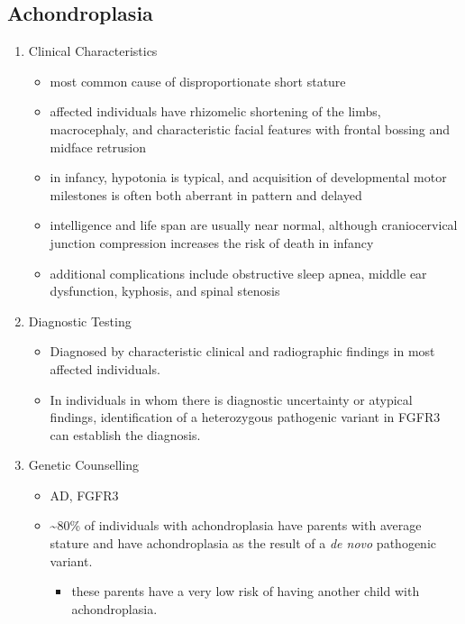 \documentclass[12pt]{scrartcl}
\begin{document}
\subsection{Achondroplasia}
\label{sec:orgec2fc75}
\begin{enumerate}
\item Clinical Characteristics
\label{sec:org15b2107}
\begin{itemize}
\item most common cause of disproportionate short stature
\item affected individuals have rhizomelic shortening of the limbs,
macrocephaly, and characteristic facial features with frontal
bossing and midface retrusion
\item in infancy, hypotonia is typical, and acquisition of developmental
motor milestones is often both aberrant in pattern and delayed
\item intelligence and life span are usually near normal, although
craniocervical junction compression increases the risk of death in
infancy
\item additional complications include obstructive sleep apnea, middle ear
dysfunction, kyphosis, and spinal stenosis
\end{itemize}

\item Diagnostic Testing
\label{sec:orga32fb81}
\begin{itemize}
\item Diagnosed by characteristic clinical and radiographic findings in
most affected individuals.
\item In individuals in whom there is diagnostic uncertainty or atypical
findings, identification of a heterozygous pathogenic variant in
FGFR3 can establish the diagnosis.
\end{itemize}

\item Genetic Counselling
\label{sec:org2ae6d5d}
\begin{itemize}
\item AD, FGFR3
\item \textasciitilde{}80\% of individuals with achondroplasia have parents with average
stature and have achondroplasia as the result of a \emph{de novo}
pathogenic variant.
\begin{itemize}
\item these parents have a very low risk of having another child with
achondroplasia.
\end{itemize}
\end{itemize}
\end{enumerate}
\end{document}
